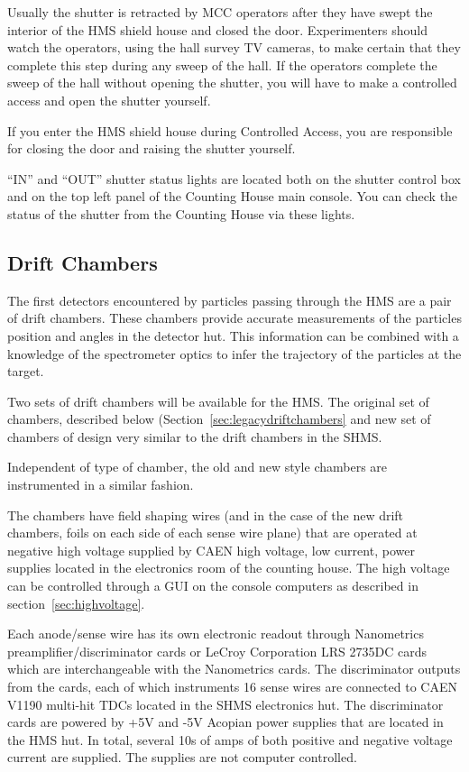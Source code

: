 Usually the shutter is retracted by MCC operators after they have
swept the interior of the HMS shield house and closed the
door. Experimenters should watch the operators, using the hall survey
TV cameras, to make certain that they complete this step during any
sweep of the hall. If the operators complete the sweep of the hall
without opening the shutter, you will have to make a controlled access
and open the shutter yourself.

If you enter the HMS shield house during Controlled Access, you are
responsible for closing the door and raising the shutter yourself.

``IN'' and ``OUT'' shutter status lights are located both on the
shutter control box and on the top left panel of the Counting House
main console. You can check the status of the shutter from the
Counting House via these lights.



\subsection{Drift Chambers}
The first detectors encountered by particles passing through the HMS
are a pair of drift chambers.  These chambers
provide accurate measurements of the particles
position and angles in the detector hut. This information can be combined
with a knowledge of the spectrometer optics to infer the trajectory of the
particles at the target.

Two sets of drift chambers will be available for the HMS.  The
original set of chambers, described below
(Section~\ref{sec:legacydriftchambers} and new set of chambers of
design very similar to the drift chambers in the SHMS.

Independent of type of chamber, the old and new style chambers are
instrumented in a similar fashion.

The chambers have field shaping wires (and in the case of the new
drift chambers, foils on each side of each sense wire plane) that are
operated at negative high voltage supplied by CAEN high voltage, low
current, power supplies located in the electronics room of the
counting house.  The high voltage can be controlled through a GUI on
the console computers as described in section~\ref{sec:highvoltage}.

Each anode/sense wire has its own electronic readout through
Nanometrics preamplifier/discriminator cards or LeCroy Corporation LRS
2735DC cards which are interchangeable with the Nanometrics cards.
The discriminator outputs from the cards, each of which instruments 16
sense wires are connected to CAEN V1190 multi-hit TDCs located in the
SHMS electronics hut.
The discriminator cards are powered by +5V and -5V Acopian power
supplies that are
located in the HMS hut.  In total, several 10s of amps of both positive
and negative voltage current are supplied.  The supplies are not
computer controlled.

